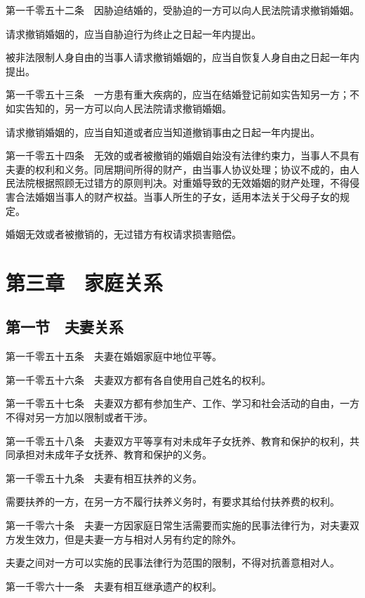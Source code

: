 \documentclass[UTF8,12pt,a4paper]{ctexbook}
\begin{document}
第一千零五十二条　因胁迫结婚的，受胁迫的一方可以向人民法院请求撤销婚姻。

请求撤销婚姻的，应当自胁迫行为终止之日起一年内提出。

被非法限制人身自由的当事人请求撤销婚姻的，应当自恢复人身自由之日起一年内提出。

第一千零五十三条　一方患有重大疾病的，应当在结婚登记前如实告知另一方；不如实告知的，另一方可以向人民法院请求撤销婚姻。

请求撤销婚姻的，应当自知道或者应当知道撤销事由之日起一年内提出。

第一千零五十四条　无效的或者被撤销的婚姻自始没有法律约束力，当事人不具有夫妻的权利和义务。同居期间所得的财产，由当事人协议处理；协议不成的，由人民法院根据照顾无过错方的原则判决。对重婚导致的无效婚姻的财产处理，不得侵害合法婚姻当事人的财产权益。当事人所生的子女，适用本法关于父母子女的规定。

婚姻无效或者被撤销的，无过错方有权请求损害赔偿。

\section*{第三章　家庭关系}

\subsection*{第一节　夫妻关系}

第一千零五十五条　夫妻在婚姻家庭中地位平等。

第一千零五十六条　夫妻双方都有各自使用自己姓名的权利。

第一千零五十七条　夫妻双方都有参加生产、工作、学习和社会活动的自由，一方不得对另一方加以限制或者干涉。

第一千零五十八条　夫妻双方平等享有对未成年子女抚养、教育和保护的权利，共同承担对未成年子女抚养、教育和保护的义务。

第一千零五十九条　夫妻有相互扶养的义务。

需要扶养的一方，在另一方不履行扶养义务时，有要求其给付扶养费的权利。

第一千零六十条　夫妻一方因家庭日常生活需要而实施的民事法律行为，对夫妻双方发生效力，但是夫妻一方与相对人另有约定的除外。

夫妻之间对一方可以实施的民事法律行为范围的限制，不得对抗善意相对人。

第一千零六十一条　夫妻有相互继承遗产的权利。
\end{document}
